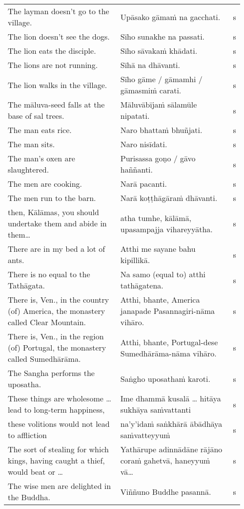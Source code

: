\documentclass[a5paper]{memoir}
\begin{document}
\begin{longtable}{L{0.48\linewidth} L{0.48\linewidth} H}
The layman doesn't go to the village. & Upāsako gāmaṁ na gacchati. & s\\[0pt]
The lion doesn't see the dogs. & Sīho sunakhe na passati. & s\\[0pt]
The lion eats the disciple. & Sīho sāvakaṁ khādati. & s\\[0pt]
The lions are not running. & Sīhā na dhāvanti. & s\\[0pt]
The lion walks in the village. & Sīho gāme / gāmamhi / gāmasmiṁ carati. & s\\[0pt]
The māluva-seed falls at the base of sal trees. & Māluvābījaṁ sālamūle nipatati. & s\\[0pt]
The man eats rice. & Naro bhattaṁ bhuñjati. & s\\[0pt]
The man sits. & Naro nisīdati. & s\\[0pt]
The man's oxen are slaughtered. & Purisassa goṇo / gāvo haññanti. & s\\[0pt]
The men are cooking. & Narā pacanti. & s\\[0pt]
The men run to the barn. & Narā koṭṭhāgāraṁ dhāvanti. & s\\[0pt]
then, Kālāmas, you should undertake them and abide in them\ldots{} & atha tumhe, kālāmā, upasampajja vihareyyātha. & s\\[0pt]
There are in my bed a lot of ants. & Atthi me sayane bahu kipillikā. & s\\[0pt]
There is no equal to the Tathāgata. & Na samo (equal to) atthi tathāgatena. & s\\[0pt]
There is, Ven., in the country (of) America, the monastery called Clear Mountain. & Atthi, bhante, America janapade Pasannagiri-nāma vihāro. & s\\[0pt]
There is, Ven., in the region (of) Portugal, the monastery called Sumedhārāma. & Atthi, bhante, Portugal-dese Sumedhārāma-nāma vihāro. & s\\[0pt]
The Sangha performs the uposatha. & Saṅgho uposathaṁ karoti. & s\\[0pt]
These things are wholesome \ldots{} lead to long-term happiness, & Ime dhammā kusalā \ldots{} hitāya sukhāya saṁvattanti & s\\[0pt]
these volitions would not lead to affliction & na'y'idaṁ saṅkhārā ābādhāya saṁvatteyyuṁ & s\\[0pt]
The sort of stealing for which kings, having caught a thief, would beat or \ldots{} & Yathārupe adinnādāne rājāno coraṁ gahetvā, haneyyuṁ vā\ldots{} & s\\[0pt]
The wise men are delighted in the Buddha. & Viññuno Buddhe pasannā. & s\\[0pt]

\end{longtable}
\end{document}
